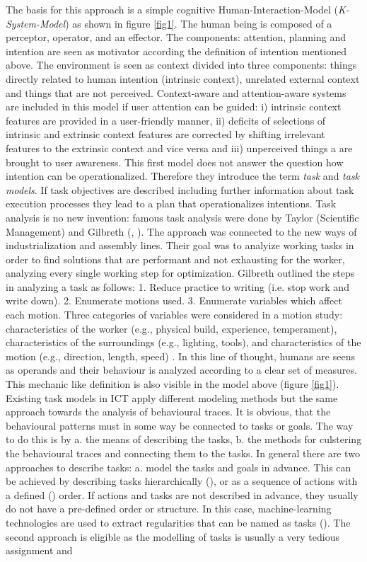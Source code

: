 The basis for this approach is a simple cognitive Human-Interaction-Model (\textit{K-System-Model}) as shown in figure \ref{fig1}. The human being is composed of a perceptor, operator, and an effector. The components: attention, planning and intention are seen as motivator according the definition of intention mentioned above. The environment is seen as context divided into three components: things directly related to human intention (intrinsic context), unrelated external context and things that are not perceived. Context-aware and attention-aware systems are included in this model if user attention can be guided: i) intrinsic context features are provided in a user-friendly manner, ii) deficits of selections of intrinsic and extrinsic context features are corrected by shifting irrelevant features to the extrinsic context and vice versa and iii) unperceived things a are brought to user awareness. This first model does not answer the question how intention can be operationalized. Therefore they introduce the term \textit{task} and \textit{task models}. If task objectives are described including further information about task execution processes they lead to a plan that operationalizes intentions. Task analysis is no new invention: famous task analysis were done by Taylor (Scientific Management) and Gilbreth (\cite{taylor2013scientific}, \cite{gilbreth1911motion}). The approach was connected to the new ways of industrialization and assembly lines. Their goal was to analyize working tasks in order to find solutions that are performant and not exhausting for the worker, analyzing every single working step for optimization. Gilbreth outlined the steps in analyzing a task as follows: 1. Reduce practice to writing (i.e. stop work and write down). 2. Enumerate motions used. 3. Enumerate variables which affect each motion. Three categories of variables were considered in a motion study: characteristics of the worker (e.g., physical build, experience, temperament), characteristics of the surroundings (e.g., lighting, tools), and characteristics of the motion (e.g., direction, length, speed) \cite{creighton1992origin}. In this line of thought, humans are seens as operands and their behaviour is analyzed according to a clear set of measures. This mechanic like definition is also visible in the model above (figure \ref{fig1}). Existing task models in \ac{ICT} apply different modeling methods but the same approach towards the analysis of behavioural traces. It is obvious, that the behavioural patterns must in some way be connected to tasks or goals. The way to do this is by a. the means of describing the tasks, b. the methods for culstering the behavioural traces and connecting them to the tasks. In general there are two approaches to describe tasks: a. model the tasks and goals in advance. This can be achieved by describing tasks hierarchically (\cite{newell1972human}), or as a sequence of actions with a defined (\cite{eder1995workflow}) order. If actions and tasks are not described in advance, they usually do not have a pre-defined order or structure. In this case, machine-learning technologies are used to extract regularities that can be named as tasks (\cite{schmitz2011contextualized}). The second approach is eligible as the modelling of tasks is usually a very tedious assignment and 